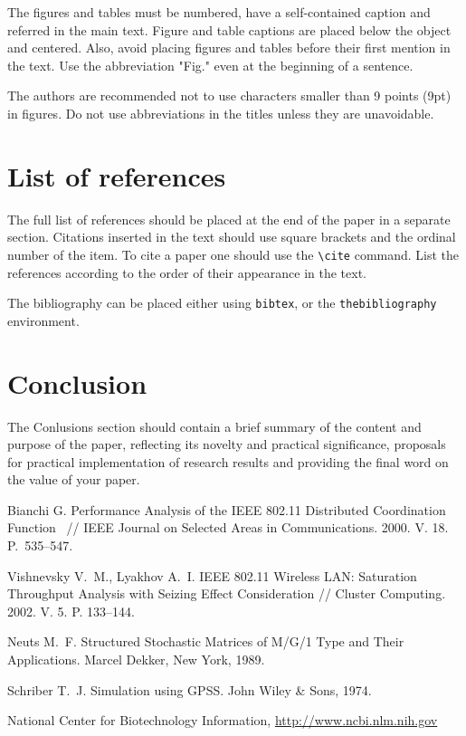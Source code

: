 \documentclass[11pt]{article}
\begin{document}
The figures and tables must be numbered, have a self-contained
caption and referred in the main text. Figure and table
captions are placed below the object and centered. Also, avoid
placing figures and tables before their first mention in the
text. Use the abbreviation "Fig." even at the beginning of a
sentence.

The authors are recommended not to use characters smaller than
9 points (9pt) in figures. Do not use abbreviations in the titles
unless they are unavoidable.

\section{List of references}
The full list of references should be placed at the end of the paper in a
separate section. Citations inserted in the text should use square
brackets and the ordinal number of the item. To cite a paper one should use the \verb"\cite" command.  List
the references according to the order of their appearance in
the text.

The bibliography can be placed either using \verb"bibtex", or the \verb"thebibliography" environment. 


\section{Conclusion}
The Conlusions section should contain a brief summary of the content and purpose of the paper, reflecting its novelty and practical significance, proposals for practical implementation of research results and providing the final word on the value of your paper.

%
%

\begin{thebibliography}{99}
Bianchi G. Performance Analysis of the IEEE 802.11 Distributed
Coordination Function ~// IEEE Journal on Selected Areas in
Communications. 2000. V. 18. P.~535--547.

 Vishnevsky V.~M., Lyakhov A.~I. IEEE 802.11
    Wireless LAN: Saturation Throughput Analysis with Seizing
    Effect Consideration
// Cluster Computing. 2002. V. 5. P. 133--144.

 Neuts M.~F.  Structured Stochastic
    Matrices of M/G/1 Type and Their Applications. Marcel
    Dekker, New York, 1989.

 Schriber T.~J. Simulation using GPSS. John
    Wiley \& Sons, 1974.
    
 National Center for Biotechnology Information, \url{http://www.ncbi.nlm.nih.gov}

\end{thebibliography}
\end{document}
